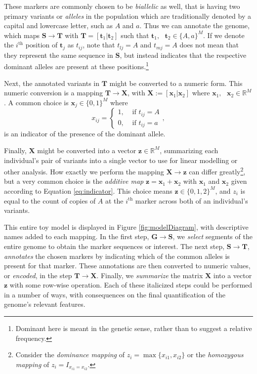 \documentclass{article}
\newcommand{\ve}[1]{\mathbf{#1}}           %
\newcommand{\m}[1]{\mathbf{#1}}               %
\newcommand{\field}[1]{\mathbb{#1}}
\newcommand{\Reals}{\field{R}}
\begin{document}
These markers are commonly chosen to be \textit{biallelic} as well, that is having two primary variants or \textit{alleles} in the population which are traditionally denoted by a capital and lowercase letter, such as $A$ and $a$. Thus we can annotate the genome, which maps $\m{S} \rightarrow \m{T}$ with $\m{T} = [\ve{t}_1 | \ve{t}_2]$ such that $\ve{t}_1, \text{ } \ve{t}_2 \in \{A,a\}^M$. If we denote the $i^{\text{th}}$ position of $\ve{t}_j$ as $t_{ij}$, note that $t_{lj} = A$ and $t_{mj} = A$ does not mean that they represent the same sequence in $\m{S}$, but instead indicates that the respective dominant alleles are present at these positions.\footnote{Dominant here is meant in the genetic sense, rather than to suggest a relative frequency.}

Next, the annotated variants in $\m{T}$ might be converted to a numeric form. This numeric conversion is a mapping $\m{T} \rightarrow \m{X}$, with $\m{X} := [\ve{x}_1 | \ve{x}_2]$ where $\ve{x}_1, \text{ } \ve{x}_2 \in \Reals^M$. A common choice is $\ve{x}_j \in \{0,1\}^M$ where
\begin{equation} \label{eq:indicator}
x_{ij} = \begin{cases}
  1, & \text{ if } t_{ij} = A \\
  0, & \text{ if } t_{ij} = a
\end{cases},
\end{equation}
is an indicator of the presence of the dominant allele.

Finally, $\m{X}$ might be converted into a vector $\ve{z} \in \Reals^M$, summarizing each individual's pair of variants into a single vector to use for linear modelling or other analysis. How exactly we perform the mapping $\m{X} \rightarrow \ve{z}$ can differ greatly\footnote{Consider the \textit{dominance mapping} of $z_i = \max\{x_{i1}, x_{i2}\}$ or the \textit{homozygous mapping} of $z_i = I_{x_{i1} = x_{i2}}$.}, but a very common choice is the \textit{additive map} $\ve{z} = \ve{x}_1 + \ve{x}_2$ with $\ve{x}_1$ and $\ve{x}_2$ given according to Equation \ref{eq:indicator}. This choice means $\ve{z} \in \{0,1,2\}^M$, and $z_i$ is equal to the count of copies of $A$ at the $i^{\text{th}}$ marker across both of an individual's variants.

This entire toy model is displayed in Figure \ref{fig:modelDiagram}, with descriptive names added to each mapping. In the first step, $\m{G} \rightarrow \m{S}$, we \textit{select} segments of the entire genome to obtain the marker sequences or interest. The next step, $\m{S} \rightarrow \m{T}$, \textit{annotates} the chosen markers by indicating which of the common alleles is present for that marker. These annotations are then converted to numeric values, or \textit{encoded}, in the step $\m{T} \rightarrow \m{X}$. Finally, we \textit{summarize} the matrix $\m{X}$ into a vector $\ve{z}$ with some row-wise operation. Each of these italicized steps could be performed in a number of ways, with consequences on the final quantification of the genome's relevant features.
\end{document}
